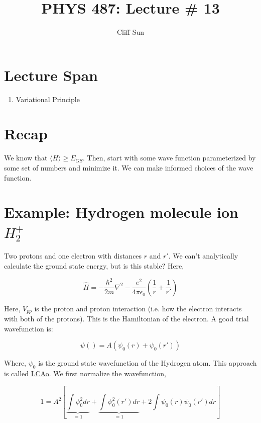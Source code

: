 \documentclass{article}
\title{PHYS 487: Lecture \# 13}
\author{Cliff Sun}
\newtheorem{one minute paper}[theorem]{One Minute Paper}
\begin{document}
\maketitle

\section*{Lecture Span}
\begin{enumerate}
    \item Variational Principle
\end{enumerate}

\section*{Recap}

We know that $\langle H \rangle \geq E_{GS}$. Then, start with some wave function parameterized by some set of numbers and minimize it. 
We can make informed choices of the wave function.


\section*{Example: Hydrogen molecule ion $H_2^{+}$}

Two protons and one electron with distances $r$ and $r'$. We can't analytically calculate the ground state energy, but is this stable? Here, 

\begin{equation}
    \hat{H} = -\frac{\hbar^2}{2m}\nabla^2 - \frac{e^2}{4\pi\epsilon_0}\left( \frac{1}{r} + \frac{1}{r'} \right)
\end{equation}

Here, $V_{pp}$ is the proton and proton interaction (i.e. how the electron interacts with both of the protons). This is the Hamiltonian of the electron. A good trial wavefunction is:

\begin{equation}
    \psi() = A(\psi_0(r) + \psi_0(r'))
\end{equation}

Where, $\psi_0$ is the ground state wavefunction of the Hydrogen atom. This approach is called \underline{LCAo}. We first normalize the wavefunction, 

\begin{equation}
    1 = A^2\left[\underbrace{\int \psi_0^2 dr }_{=1}+ \underbrace{\int \psi_0^2(r')dr}_{=1} + 2\int \psi_0(r)\psi_0(r')dr\right]
\end{equation}
\end{document}
